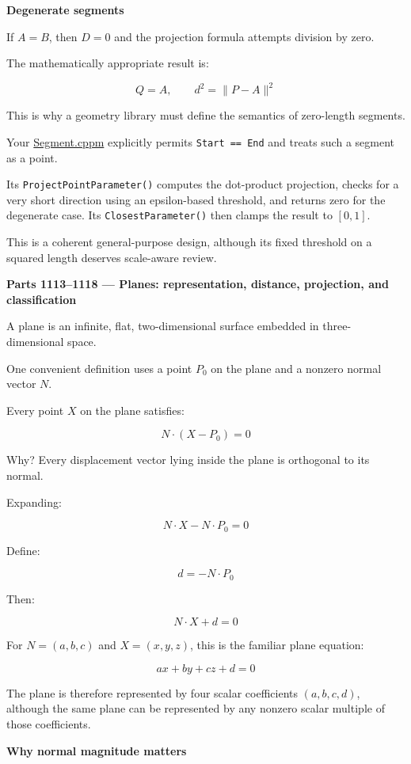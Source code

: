 \textbf{Degenerate segments}

If \(A=B\), then \(D=0\) and the projection formula attempts division by zero.

The mathematically appropriate result is:

\[
Q=A,\qquad d^2=\|P-A\|^2
\]

This is why a geometry library must define the semantics of zero-length segments.

Your \href{https://github.com/swayam8624/KairoGeometry/blob/master/Segment.cppm?utm_source=chatgpt.com}{Segment.cppm} explicitly permits \texttt{Start\ ==\ End} and treats such a segment as a point.

Its \texttt{ProjectPointParameter()} computes the dot-product projection, checks for a very short direction using an epsilon-based threshold, and returns zero for the degenerate case. Its \texttt{ClosestParameter()} then clamps the result to \([0,1]\).

This is a coherent general-purpose design, although its fixed threshold on a squared length deserves scale-aware review.

\textbf{Parts 1113--1118 --- Planes: representation, distance, projection, and classification}

A plane is an infinite, flat, two-dimensional surface embedded in three-dimensional space.

One convenient definition uses a point \(P_0\) on the plane and a nonzero normal vector \(N\).

Every point \(X\) on the plane satisfies:

\[
\boxed{N\cdot(X-P_0)=0}
\]

Why? Every displacement vector lying inside the plane is orthogonal to its normal.

Expanding:

\[
N\cdot X-N\cdot P_0=0
\]

Define:

\[
d=-N\cdot P_0
\]

Then:

\[
\boxed{N\cdot X+d=0}
\]

For \(N=(a,b,c)\) and \(X=(x,y,z)\), this is the familiar plane equation:

\[
ax+by+cz+d=0
\]

The plane is therefore represented by four scalar coefficients \((a,b,c,d)\), although the same plane can be represented by any nonzero scalar multiple of those coefficients.

\textbf{Why normal magnitude matters}

